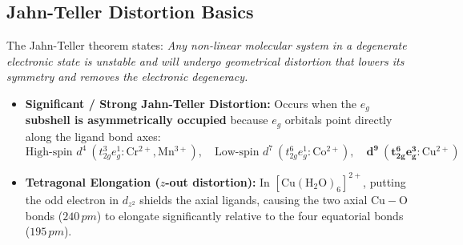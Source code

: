 \documentclass[10pt,a4paper]{article}
\begin{document}
\subsection{Jahn-Teller Distortion Basics}
The Jahn-Teller theorem states: \textit{Any non-linear molecular system in a degenerate electronic state is unstable and will undergo geometrical distortion that lowers its symmetry and removes the electronic degeneracy.}
\begin{itemize}
  \item \textbf{Significant / Strong Jahn-Teller Distortion:} Occurs when the \textbf{$e_g$ subshell is asymmetrically occupied} because $e_g$ orbitals point directly along the ligand bond axes:
  \begin{equation}
    \text{High-spin } d^4\ (t_{2g}^3 e_g^1: \mathrm{Cr^{2+}, Mn^{3+}}), \quad \text{Low-spin } d^7\ (t_{2g}^6 e_g^1: \mathrm{Co^{2+}}), \quad \mathbf{d^9\ (t_{2g}^6 e_g^3: \mathrm{Cu^{2+}})}
  \end{equation}
  \item \textbf{Tetragonal Elongation ($z$-out distortion):}
  In $[\mathrm{Cu(H_2O)_6}]^{2+}$, putting the odd electron in $d_{z^2}$ shields the axial ligands, causing the two axial $\mathrm{Cu-O}$ bonds ($240\,\si{pm}$) to elongate significantly relative to the four equatorial bonds ($195\,\si{pm}$).
\end{itemize}
\end{document}

